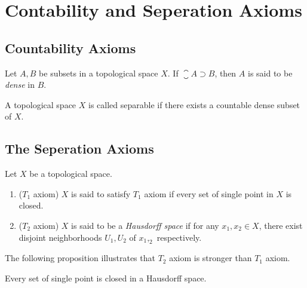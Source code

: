 \chapter{Contability and Seperation Axioms}
\label{chp:countability_and_seperation_axioms}
\section{Countability Axioms}
\label{sec:countability_axioms}
\begin{defn}
Let $A, B$ be subsets in a topological space $X$. If $\closure{A} \supset 
B$, then $A$ is said to be \emph{dense} in $B$. 
\end{defn}

\begin{defn}
A topological space $X$ is called separable if there exists a countable 
dense subset of $X$. 
\end{defn}

\section{The Seperation Axioms}
\begin{defn}
Let $X$ be a topological space. 
\begin{enumerate}
    \item ($T_1$ axiom) $X$ is said to satisfy $T_1$ axiom if every set 
    of single point in $X$ is closed. 
    \item ($T_2$ axiom) $X$ is said to be a \emph{Hausdorff space} if for 
    any $x_1, x_2 \in X$, there exist disjoint neighborhoods $U_1, U_2$ of 
    $x_1, _2$ respectively. 
\end{enumerate}

The following proposition illustrates that $T_2$ axiom is stronger than 
$T_1$ axiom. 
\begin{prop}
Every set of single point is closed in a Hausdorff space. 
\end{prop}
\end{defn}